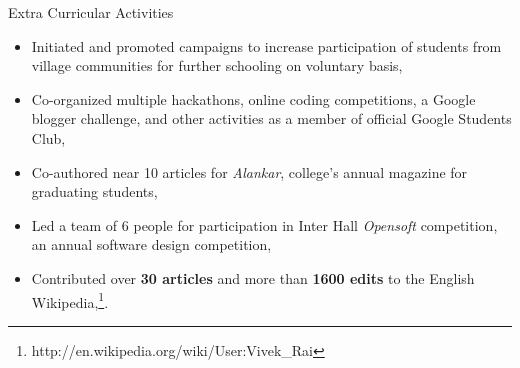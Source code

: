 \documentclass{article}
\newlength{\tabin}
\newlength{\secsep}
\newcommand{\lineunder}{\vspace*{-8pt} \\ \hspace*{-6pt} \hrulefill \\ \vspace*{-15pt}}
\newenvironment{tabbedsection}[1]{
  \begin{list}{}{
      \setlength{\itemsep}{0pt}
      \setlength{\labelsep}{0pt}
      \setlength{\labelwidth}{0pt}
      \setlength{\leftmargin}{\tabin}
      \setlength{\rightmargin}{\tabin}
      \setlength{\listparindent}{0pt}
      \setlength{\parsep}{0pt}
      \setlength{\parskip}{0pt}
      \setlength{\partopsep}{0pt}
      \setlength{\topsep}{#1}
    }
  \item[]
}{\end{list}}
\newenvironment{resume_section}[1]{
  \filbreak
  \vspace{2\secsep}
  \textsc{\large#1}
  \lineunder
  \begin{tabbedsection}{\secsep}
}{\end{tabbedsection}}
\newenvironment{subitems}{
  \renewcommand{\labelitemi}{$\cdot$}
  \begin{itemize}
      \setlength{\labelsep}{1em}
}{\end{itemize}}
\begin{document}
\begin{resume_section}{Extra Curricular Activities}
    \begin{subitems}
    \item Initiated and promoted campaigns to increase participation of students from village communities for further schooling on voluntary basis,
      \item Co-organized multiple hackathons, online coding competitions, a Google blogger challenge, and other activities as a member of official Google Students Club,
      \item Co-authored near 10 articles for \emph{Alankar}, college's annual magazine for graduating students,
      \item Led a team of 6 people for participation in Inter Hall \emph{Opensoft} competition, an annual software design competition,
      \item Contributed over \textbf{30 articles} and more than \textbf{1600 edits} to the English Wikipedia,\footnote{http://en.wikipedia.org/wiki/User:Vivek\_Rai}.
    \end{subitems}
\end{resume_section}
\end{document}
